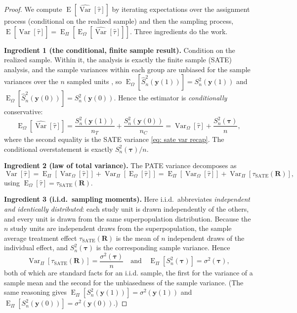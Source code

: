 \documentclass[12pt,leqno]{article}
\theoremstyle{newstyle}
\DeclareMathOperator{\E}{\mathrm{E}}
\DeclareMathOperator{\Var}{\mathrm{Var}}
\newcommand{\bR}{\bm{R}}   \newcommand{\br}{\bm{r}}   %
\newcommand{\EZ}{\E_{\Omega}}    \newcommand{\VarZ}{\Var_{\Omega}}  %
\newcommand{\ER}{\E_{\Pi}}       \newcommand{\VarR}{\Var_{\Pi}}     %
\newcommand{\pov}[1]{\bm{y}(#1)}    %
\newcommand{\tauS}{\tau_{\text{SATE}}}
\newcommand{\tauhat}{\hat{\tau}}
\newcommand{\Ssq}[2][n]{S_{#1}^{2}(#2)}
\newcommand{\ssq}[2][n]{\sigma_{#1}^{2}(#2)}
\newcommand{\Ssqhat}[2][n]{\widehat{S}_{#1}^{2}(#2)}
\newcommand{\Varhat}{\widehat{\Var}}
\begin{document}
\begin{proof}
We compute $\E[\Varhat[\tauhat]]$ by iterating expectations over the assignment process (conditional on the realized sample) and then the sampling process, $\E[\Varhat[\tauhat]] = \ER[\EZ[\Varhat[\tauhat]]]$. Three ingredients do the work.

\textbf{Ingredient 1 (the conditional, finite sample result).} Condition on the realized sample. Within it, the analysis is exactly the finite sample (SATE) analysis, and the sample variances within each group are unbiased for the sample variances over the $n$ sampled units \citep[][Theorem 2.4]{cochran1977}, so $\EZ[\Ssqhat{\pov{1}}] = \Ssq{\pov{1}}$ and $\EZ[\Ssqhat{\pov{0}}] = \Ssq{\pov{0}}$. Hence the estimator is \textit{conditionally} conservative:
\small
\begin{equation*}
\EZ\left[\Varhat\left[\tauhat\right]\right] = \dfrac{\Ssq{\pov{1}}}{n_T} + \dfrac{\Ssq{\pov{0}}}{n_C} = \VarZ\left[\tauhat\right] + \dfrac{\Ssq{\bm{\tau}}}{n},
\end{equation*}
\normalsize
where the second equality is the SATE variance \eqref{eq: sate var recap}. The conditional overstatement is exactly $\Ssq{\bm{\tau}}/n$.

\textbf{Ingredient 2 (law of total variance).} The PATE variance decomposes as
\small
\begin{equation*}
\Var\left[\tauhat\right] = \ER\left[\VarZ\left[\tauhat\right]\right] + \VarR\left[\EZ\left[\tauhat\right]\right] = \ER\left[\VarZ\left[\tauhat\right]\right] + \VarR\left[\tauS(\bR)\right],
\end{equation*}
\normalsize
using $\EZ[\tauhat] = \tauS(\bR)$.

\textbf{Ingredient 3 (i.i.d.\ sampling moments).} Here i.i.d.\ abbreviates \textit{independent and identically distributed}: each study unit is drawn independently of the others, and every unit is drawn from the same superpopulation distribution. Because the $n$ study units are independent draws from the superpopulation, the sample average treatment effect $\tauS(\bR)$ is the mean of $n$ independent draws of the individual effect, and $\Ssq{\bm{\tau}}$ is the corresponding sample variance. Hence
\small
\begin{equation*}
\VarR\left[\tauS(\bR)\right] = \dfrac{\ssq[]{\bm{\tau}}}{n} \quad \text{and} \quad \ER\left[\Ssq{\bm{\tau}}\right] = \ssq[]{\bm{\tau}},
\end{equation*}
\normalsize
both of which are standard facts for an i.i.d. sample, the first for the variance of a sample mean and the second for the unbiasedness of the sample variance. (The same reasoning gives $\ER[\Ssq{\pov{1}}] = \ssq[]{\pov{1}}$ and $\ER[\Ssq{\pov{0}}] = \ssq[]{\pov{0}}$.)


\end{proof}
\end{document}
